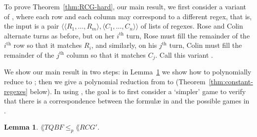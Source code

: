 \documentclass{article}
\newcommand{\0}{\mathbf{0}}
\newcommand{\1}{\mathbf{1}}
\newcommand{\2}{\mathbf{2}}
\newcommand{\tup}[1]{\langle{} #1 \rangle{}}
\newcommand{\reducp}[2]{{{#1} \le_p {#2}}}
\newcounter{row}
\newcounter{col}
\theoremstyle{plain}
\newtheorem{lemma}[theorem]{Lemma}
\theoremstyle{definition}
\begin{document}
To prove Theorem~\ref{thm:RCG-hard}, our main result, we first consider a variant of , where each row and each column may correspond to a different regex, that is, the input is a pair $\tup{\tup{R_1,\ldots,R_m},\tup{C_1,\ldots,C_n}}$ of lists of regexes. Rose and Colin alternate turns as before, but on her $i^\text{th}$ turn, Rose must fill the remainder of the $i^\text{th}$ row so that it matches $R_i$, and similarly, on his $j^\text{th}$ turn, Colin must fill the remainder of the $j^\text{th}$ column so that it matches $C_j$.  Call this variant .

We show our main result in two steps: in Lemma~\ref{lem:RCG-prime} we show how to polynomially reduce  to ; then we give a polynomial reduction from  to  (Theorem~\ref{thm:constant-regexes} below).  In using , the goal is to first consider a `simpler' game to verify that there is a correspondence between the formul\ae{} in  and the possible games in .

\begin{lemma}\label{lem:RCG-prime}
  $\reducp{\lang{TQBF}}{\lang{RCG'}}$.
\end{lemma}
\end{document}
